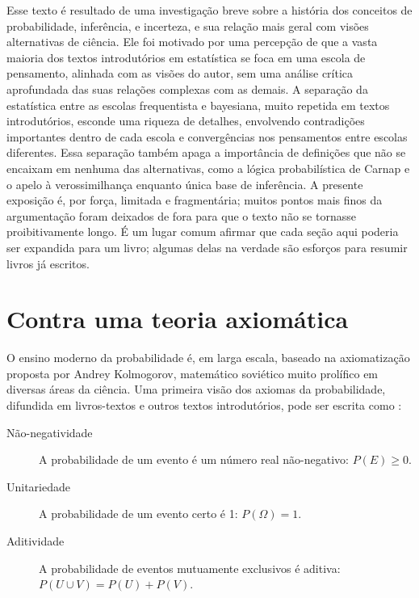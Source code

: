 Esse texto é resultado de uma investigação breve sobre a história dos conceitos de probabilidade, inferência, e incerteza,
e sua relação mais geral com visões alternativas de ciência. Ele foi motivado por uma percepção de que a vasta maioria dos
textos introdutórios em estatística se foca em uma escola de pensamento, alinhada com as visões do autor, sem uma análise crítica
aprofundada das suas relações complexas com as demais. A separação da estatística entre as escolas frequentista e bayesiana,
muito repetida em textos introdutórios, esconde uma riqueza de detalhes, envolvendo contradições importantes dentro de cada
escola e convergências nos pensamentos entre escolas diferentes. Essa separação também apaga a importância de definições que
não se encaixam em nenhuma das alternativas, como a lógica probabilística de Carnap e o apelo à verossimilhança enquanto 
única base de inferência. A presente exposição é, por força, limitada e fragmentária; muitos pontos mais finos da argumentação
foram deixados de fora para que o texto não se tornasse proibitivamente longo. É um lugar comum afirmar que cada 
seção aqui poderia ser expandida para um livro; algumas delas na verdade são esforços para resumir livros já escritos.

\section{Contra uma teoria axiomática}\label{sec:axiomatica}
O ensino moderno da probabilidade é, em larga escala, baseado na axiomatização proposta por Andrey 
Kolmogorov, matemático soviético muito prolífico em diversas áreas da ciência. 
Uma primeira visão dos axiomas da probabilidade, difundida em livros-textos e outros textos introdutórios, 
pode ser escrita como \citep{LeBlanc04, Freedman07, Morettin09}:

\begin{description}
	\item[Não-negatividade] A probabilidade de um evento é um número real não-negativo: $P(E) \geq 0$.
	\item[Unitariedade] A probabilidade de um evento certo é 1: $P(\Omega) = 1$.
	\item[Aditividade] A probabilidade de eventos mutuamente exclusivos é aditiva: $P(U \cup V) = P(U)+P(V)$.
\end{description}

